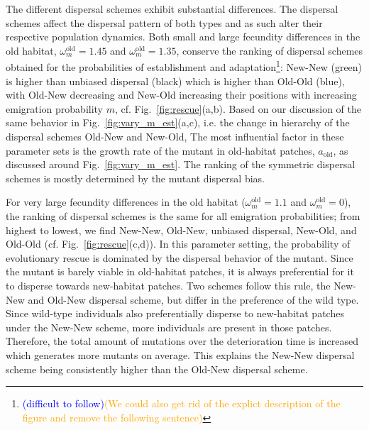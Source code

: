 \documentclass[11pt]{article}
\newcommand{\francois}[1]{\textcolor{blue}{(#1)}}
\newcommand{\pete}[1]{\textcolor{orange}{(#1)}}
\newcommand{\chg}[1]{\textcolor{change}{#1}}
\begin{document}
The different dispersal schemes exhibit substantial differences. The dispersal schemes affect the dispersal pattern of both types and as such alter their respective population dynamics. Both small and large fecundity differences in the old habitat, $\omega^\text{old}_m=1.45$ and $\omega^\text{old}_m=1.35$, conserve the ranking of dispersal schemes obtained for the probabilities of establishment and adaptation\footnote{\francois{difficult to follow}\pete{We could also get rid of the explict description of the figure and remove the following sentence}}: \chg{New-New (green) is higher than unbiased dispersal (black) which is higher than Old-Old (blue), with Old-New decreasing and New-Old increasing their positions with increasing emigration probability $m$}, cf. Fig.~\ref{fig:rescue}(a,b). Based on our discussion of the same behavior in Fig.~\ref{fig:vary_m_est}(a,c), \chg{i.e. the change in hierarchy of the dispersal schemes Old-New and New-Old,} The most influential factor in these parameter sets is the growth rate of the mutant in old-habitat patches, $a_{\text{old}}$, \chg{as discussed around Fig.~\ref{fig:vary_m_est}.} \chg{The ranking of the symmetric dispersal schemes is mostly determined by the mutant dispersal bias.}

For very large fecundity differences in the old habitat ($\omega^\text{old}_m = 1.1$ and $\omega^\text{old}_m=0$), the ranking of dispersal schemes is the same for all emigration probabilities; from highest to lowest, we find \chg{New-New, Old-New, unbiased dispersal, New-Old, and Old-Old} (cf. Fig.~\ref{fig:rescue}(c,d)). In this parameter setting, the probability of evolutionary rescue is dominated by the dispersal behavior of the mutant. Since the mutant is barely viable in old-habitat patches, it is always preferential for it to disperse towards new-habitat patches. Two schemes follow this rule, \chg{the New-New and Old-New dispersal scheme}, but differ in the preference of the wild type. 
Since wild-type individuals also preferentially disperse to new-habitat patches under \chg{the New-New scheme}, more individuals are present in those patches. Therefore, the total amount of mutations over the deterioration time is increased which generates more mutants on average. This explains the New-New dispersal scheme being consistently higher than the Old-New dispersal scheme.
\end{document}
